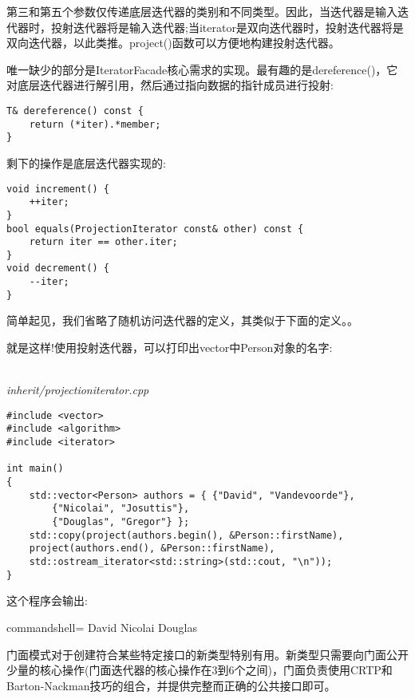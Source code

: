 第三和第五个参数仅传递底层迭代器的类别和不同类型。因此，当迭代器是输入迭代器时，投射迭代器将是输入迭代器;当iterator是双向迭代器时，投射迭代器将是双向迭代器，以此类推。project()函数可以方便地构建投射迭代器。

唯一缺少的部分是IteratorFacade核心需求的实现。最有趣的是dereference()，它对底层迭代器进行解引用，然后通过指向数据的指针成员进行投射:

\begin{lstlisting}[style=styleCXX]
T& dereference() const {
	return (*iter).*member;
}
\end{lstlisting}

剩下的操作是底层迭代器实现的:

\begin{lstlisting}[style=styleCXX]
void increment() {
	++iter;
}
bool equals(ProjectionIterator const& other) const {
	return iter == other.iter;
}
void decrement() {
	--iter;
}
\end{lstlisting}

简单起见，我们省略了随机访问迭代器的定义，其类似于下面的定义。。

就是这样!使用投射迭代器，可以打印出vector中Person对象的名字:

\hspace*{\fill} \\ %
\noindent
\textit{inherit/projectioniterator.cpp}
\begin{lstlisting}[style=styleCXX]
#include <vector>
#include <algorithm>
#include <iterator>

int main()
{
	std::vector<Person> authors = { {"David", "Vandevoorde"},
		{"Nicolai", "Josuttis"},
		{"Douglas", "Gregor"} };
	std::copy(project(authors.begin(), &Person::firstName),
	project(authors.end(), &Person::firstName),
	std::ostream_iterator<std::string>(std::cout, "\n"));
}
\end{lstlisting}

这个程序会输出:

\begin{tcblisting}{commandshell={}}
David
Nicolai
Douglas
\end{tcblisting}

门面模式对于创建符合某些特定接口的新类型特别有用。新类型只需要向门面公开少量的核心操作(门面迭代器的核心操作在3到6个之间)，门面负责使用CRTP和Barton-Nackman技巧的组合，并提供完整而正确的公共接口即可。













